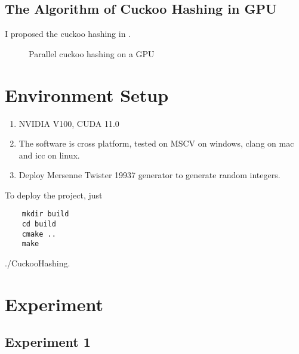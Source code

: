 \documentclass[twoside,11pt]{article}
\begin{document}
\subsection{The Algorithm of Cuckoo Hashing in GPU}
I proposed the cuckoo hashing in \cite{zhou2015massively}.
\begin{figure}
    \centering
  
    \caption{Parallel cuckoo hashing on a GPU}
  \end{figure}
\section{Environment Setup}
\begin{enumerate}
    \item NVIDIA V100, CUDA 11.0
    \item The software is cross platform, tested on MSCV on windows, clang on mac and icc on linux.
    \item Deploy Mersenne Twister 19937 generator to generate random integers.
\end{enumerate}
To deploy the project, just 


\lstset{language=bash}
\begin{lstlisting}
    mkdir build 
    cd build 
    cmake ..
    make 
\end{lstlisting}
./CuckooHashing.
\section{Experiment}
\subsection{Experiment 1}
\end{document}
